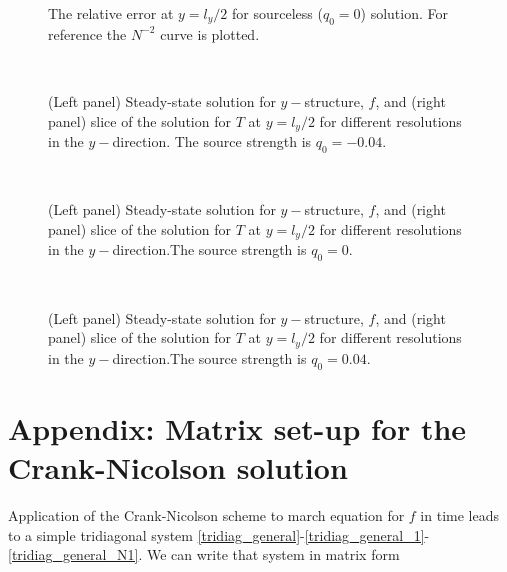 \documentclass[11pt]{article}
\begin{document}
\begin{enumerate}[label=(\alph*)]
        \begin{figure}[h]
           \centerline{}
           \caption{The relative error at $y=l_y/2$ for sourceless ($q_0=0$) solution. For reference the $N^{-2}$ curve is plotted.}
        \label{error_cn}
        \end{figure}

        \begin{figure}[p]
        \centerline{\\
        }
        \caption{(Left panel) Steady-state solution for $y-$structure, $f$, and (right panel) slice of the solution for $T$ at $y=l_y/2$ for different resolutions in the $y-$direction. The source strength is $q_0=-0.04$.}
        \label{soln_cn_various_N_1}
        \end{figure}

       \begin{figure}[p]
        \centerline{\\
        }
        \caption{(Left panel) Steady-state solution for $y-$structure, $f$, and (right panel) slice of the solution for $T$ at $y=l_y/2$ for different resolutions in the $y-$direction.The source strength is $q_0=0$.}
        \label{soln_cn_various_N_2}
        \end{figure}

       \begin{figure}[p]
        \centerline{\\
        }
        \caption{(Left panel) Steady-state solution for $y-$structure, $f$, and (right panel) slice of the solution for $T$ at $y=l_y/2$ for different resolutions in the $y-$direction.The source strength is $q_0=0.04$.}
        \label{soln_cn_various_N_2}
        \end{figure}




\end{enumerate}


\newpage
\section*{Appendix: Matrix set-up for the Crank-Nicolson solution}

Application of the Crank-Nicolson scheme to march equation for $f$ in time leads to a simple tridiagonal system \eqref{tridiag_general}-\eqref{tridiag_general_1}-\eqref{tridiag_general_N1}. We can write that system in matrix form 
\end{document}
